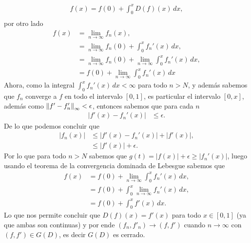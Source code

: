 \begin{homeworkProblem}
\begin{solution}
    \begin{align*}
      f(x)=f(0)+\int_{0}^{x}D(f)(x)\, dx,\\
    \end{align*}
    por otro lado
    \begin{align*}
      f(x)&=\lim_{n \to \infty}f_{n}(x),\\
      &=\lim_{n \to \infty}f_{n}(0)+\int_{0}^{x}f_{n}'(x)\, dx,\\
      &=\lim_{n \to \infty}f_{n}(0)+\lim_{n \to \infty}\int_{0}^{x}f_{n}'(x)\, dx,\\
      &=f(0)+\lim_{n \to \infty}\int_{0}^{x}f_{n}'(x)\, dx
    \end{align*}
    Ahora, como la integral $\int_{0}^{x}f_{n}'(x)\, dx<\infty$ para todo $n>N$, y además sabemos que $f_{n}$ converge a $f$ en todo el intervalo $[0,1]$, es particular el intervalo $[0,x]$, además como $\left\|f'-f'_{n}\right\|_{\infty}<\epsilon$, entonces sabemos que para cada $n$
    \begin{align*}
      \left| f'(x)-f_{n}'(x) \right|&\leq \epsilon.
    \end{align*}
    De lo que podemos concluir que
    \begin{align*}
      |f_{n}(x)|&\leq \left| f'(x)-f_{n}'(x) \right|+|f'(x)|,\\
      &\leq |f'(x)|+\epsilon.
    \end{align*}
    Por lo que para todo $n>N$ sabemos que $g(t)=|f(x)|+\epsilon\geq |f_{n}'(x)|$, luego usando el teorema de la convergencia dominada de Lebesgue sabemos que
    \begin{align*}
      f(x)&=f(0)+\lim_{n \to \infty}\int_{0}^{x}f_{n}'(x)\, dx,\\
      &=f(0)+\int_{0}^{x}\lim_{n \to \infty}f_{n}'(x)\, dx,\\
      &=f(0)+\int_{0}^{x}f'(x)\, dx.
    \end{align*}
    Lo que nos permite concluir que $D(f)(x)=f'(x)$ para todo $x\in [0,1]$ (ya que ambas son continuas) y por ende $(f_{n},f'_{n})\to (f,f')$ cuando $n\to\infty$ con $(f,f')\in G(D)$, es decir $G(D)$ es cerrado. 
  \end{solution}
\end{homeworkProblem}
